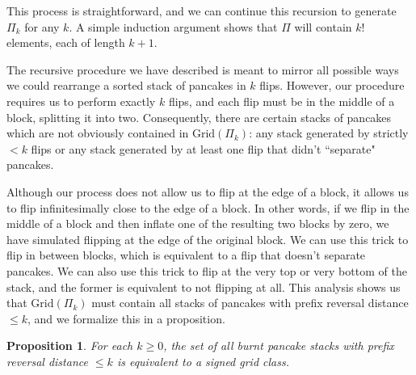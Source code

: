 \documentclass{article}
\numberwithin{equation}{section}
\newtheorem{prop}[thm]{Proposition}
\theoremstyle{definition}
\newcommand{\Grid}{\text{Grid}}
\begin{document}
This process is straightforward, and we can continue this recursion to generate $\Pi_k$ for any $k$.  A simple induction argument shows that $\Pi$ will contain $k!$ elements, each of length $k+1$.

The recursive procedure we have described is meant to mirror all possible ways we could rearrange a sorted stack of pancakes in $k$ flips.  However, our procedure requires us to perform exactly $k$ flips, and each flip must be in the middle of a block, splitting it into two.  Consequently, there are certain stacks of pancakes which are not obviously contained in $\Grid(\Pi_k)$: any stack generated by strictly $<k$ flips or any stack generated by at least one flip that didn't ``separate" pancakes.

Although our process does not allow us to flip at the edge of a block, it allows us to flip infinitesimally close to the edge of a block.  In other words, if we flip in the middle of a block and then inflate one of the resulting two blocks by zero, we have simulated flipping at the edge of the original block.  We can use this trick to flip in between blocks, which is equivalent to a flip that doesn't separate pancakes.  We can also use this trick to flip at the very top or very bottom of the stack, and the former is equivalent to not flipping at all.  This analysis shows us that $\Grid(\Pi_k)$ must contain all stacks of pancakes with prefix reversal distance $\leq k$, and we formalize this in a proposition.



\begin{prop}\label{prop:gridpancake}
For each $k\geq0$, the set of all burnt pancake stacks with  prefix reversal distance $\leq k$ is equivalent to a signed grid class.
\end{prop}
\end{document}
